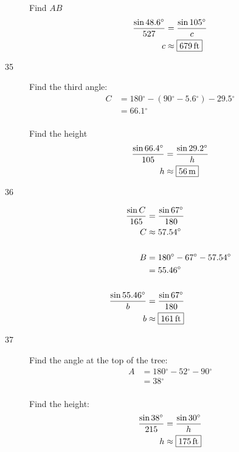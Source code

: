 \documentclass{exam}
\newcommand{\dg}{\ensuremath{^\circ}}
\begin{document}
\begin{description}
        Find $AB$
        \begin{align*}
          \frac{\sin 48.6 \dg}{527} & = \frac{\sin 105 \dg}{c} \\
          c                         & \approx \boxed{ \unit[679]{ft} } \\
        \end{align*}

      \item[35] 
        Find the third angle:
        \begin{align*}
          C & = 180 \dg - (90 \dg - 5.6 \dg) - 29.5 \dg \\
            & = 66.1 \dg \\
        \end{align*}

        Find the height
        \begin{align*}
          \frac{\sin 66.4 \dg}{105} & = \frac{\sin 29.2 \dg}{h} \\
          h                         & \approx \boxed{ \unit[56]{m} } \\
        \end{align*}

      \item[36] 
        \begin{align*}
          \frac{\sin C}{165} & = \frac{\sin 67 \dg}{180} \\
          C                  & \approx 57.54 \dg \\
          \\
          B & = 180 \dg - 67 \dg - 57.54 \dg \\
            & = 55.46 \dg \\
          \\
          \frac{\sin 55.46 \dg}{b} & = \frac{\sin 67 \dg}{180} \\
          b                        & \approx \boxed{ \unit[161]{ft} } \\
        \end{align*}

      \item[37] 
        Find the angle at the top of the tree:
        \begin{align*}
          A & = 180 \dg - 52 \dg - 90 \dg \\
            & = 38 \dg \\
        \end{align*}

        Find the height:
        \begin{align*}
          \frac{\sin 38 \dg}{215} & = \frac{\sin 30 \dg}{h} \\
          h                       & \approx \boxed{ \unit[175]{ft} } \\
        \end{align*}


\end{description}
\end{document}
